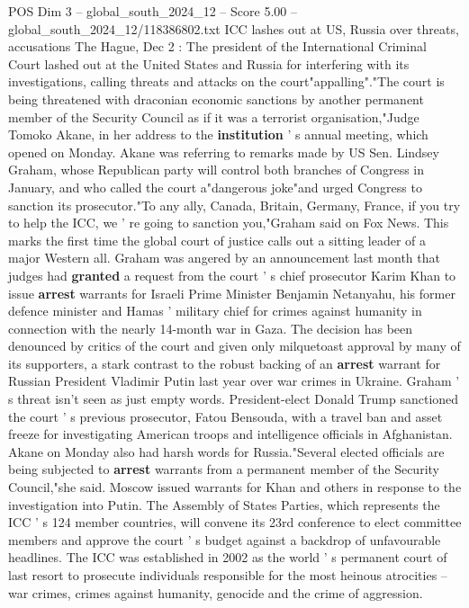 \begin{textsample}{POS Dim 3 – global\_south\_2024\_12 – Score 5.00 – global\_south\_2024\_12/118386802.txt}  \label{ex:f3_pos_396}
ICC lashes out at US, Russia over threats, accusations The Hague, Dec 2 : The president of the International Criminal Court lashed out at the United States and Russia for interfering with its investigations, calling threats and attacks on the court"appalling"."The court is being threatened with draconian economic sanctions by another permanent member of the Security Council as if it was a terrorist organisation,"Judge Tomoko Akane, in her address to the \textbf{institution} ' s annual meeting, which opened on Monday.
Akane was referring to remarks made by US Sen.
Lindsey Graham, whose Republican party will control both branches of Congress in January, and who called the court a"dangerous joke"and urged Congress to sanction its prosecutor."To any ally, Canada, Britain, Germany, France, if you try to help the ICC, we ' re going to sanction you,"Graham said on Fox News.
This marks the first time the global court of justice calls out a sitting leader of a major Western all.
Graham was angered by an announcement last month that judges had \textbf{granted} a request from the court ' s chief prosecutor Karim Khan to issue \textbf{arrest} warrants for Israeli Prime Minister Benjamin Netanyahu, his former defence minister and Hamas ' military chief for crimes against humanity in connection with the nearly 14-month war in Gaza.
The decision has been denounced by critics of the court and given only milquetoast approval by many of its supporters, a stark contrast to the robust backing of an \textbf{arrest} warrant for Russian President Vladimir Putin last year over war crimes in Ukraine.
Graham ' s threat isn't seen as just empty words.
President-elect Donald Trump sanctioned the court ' s previous prosecutor, Fatou Bensouda, with a travel ban and asset freeze for investigating American troops and intelligence officials in Afghanistan.
Akane on Monday also had harsh words for Russia."Several elected officials are being subjected to \textbf{arrest} warrants from a permanent member of the Security Council,"she said.
Moscow issued warrants for Khan and others in response to the investigation into Putin.
The Assembly of States Parties, which represents the ICC ' s 124 member countries, will convene its 23rd conference to elect committee members and approve the court ' s budget against a backdrop of unfavourable headlines.
The ICC was established in 2002 as the world ' s permanent court of last resort to prosecute individuals responsible for the most heinous atrocities -- war crimes, crimes against humanity, genocide and the crime of aggression.

\end{textsample}
